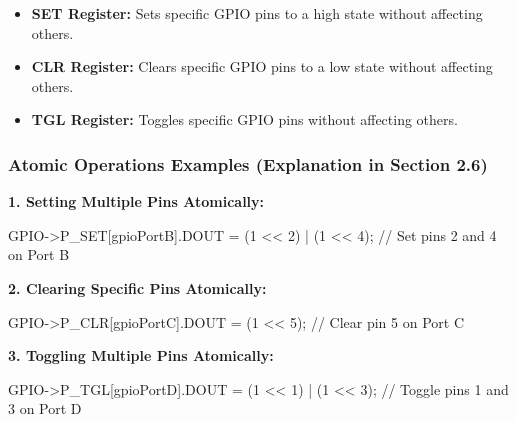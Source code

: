 \documentclass[
  9pt,
  letterpaper,
  abstract,
  titlepage]{scrbook}
\newenvironment{Shaded}{\begin{snugshade}}{\end{snugshade}}
\newcommand{\CommentTok}[1]{\textcolor[rgb]{0.37,0.37,0.37}{#1}}
\newcommand{\DecValTok}[1]{\textcolor[rgb]{0.68,0.00,0.00}{#1}}
\newcommand{\NormalTok}[1]{\textcolor[rgb]{0.00,0.23,0.31}{#1}}
\newcommand{\OperatorTok}[1]{\textcolor[rgb]{0.37,0.37,0.37}{#1}}
\begin{document}
\begin{itemize}
\item
  \textbf{SET Register:} Sets specific GPIO pins to a high state without
  affecting others.
\item
  \textbf{CLR Register:} Clears specific GPIO pins to a low state
  without affecting others.
\item
  \textbf{TGL Register:} Toggles specific GPIO pins without affecting
  others.
\end{itemize}

\subsubsection{Atomic Operations Examples (Explanation in Section
2.6)}\label{atomic-operations-examples-explanation-in-section-2.6}

\textbf{1. Setting Multiple Pins Atomically:}

\begin{Shaded}
\begin{Highlighting}[]
\NormalTok{GPIO}\OperatorTok{{-}\textgreater{}}\NormalTok{P\_SET}\OperatorTok{[}\NormalTok{gpioPortB}\OperatorTok{].}\NormalTok{DOUT }\OperatorTok{=} \OperatorTok{(}\DecValTok{1} \OperatorTok{\textless{}\textless{}} \DecValTok{2}\OperatorTok{)} \OperatorTok{|} \OperatorTok{(}\DecValTok{1} \OperatorTok{\textless{}\textless{}} \DecValTok{4}\OperatorTok{);} \CommentTok{// Set pins 2 and 4 on Port B}
\end{Highlighting}
\end{Shaded}

\textbf{2. Clearing Specific Pins Atomically:}

\begin{Shaded}
\begin{Highlighting}[]
\NormalTok{GPIO}\OperatorTok{{-}\textgreater{}}\NormalTok{P\_CLR}\OperatorTok{[}\NormalTok{gpioPortC}\OperatorTok{].}\NormalTok{DOUT }\OperatorTok{=} \OperatorTok{(}\DecValTok{1} \OperatorTok{\textless{}\textless{}} \DecValTok{5}\OperatorTok{);} \CommentTok{// Clear pin 5 on Port C}
\end{Highlighting}
\end{Shaded}

\textbf{3. Toggling Multiple Pins Atomically:}

\begin{Shaded}
\begin{Highlighting}[]
\NormalTok{GPIO}\OperatorTok{{-}\textgreater{}}\NormalTok{P\_TGL}\OperatorTok{[}\NormalTok{gpioPortD}\OperatorTok{].}\NormalTok{DOUT }\OperatorTok{=} \OperatorTok{(}\DecValTok{1} \OperatorTok{\textless{}\textless{}} \DecValTok{1}\OperatorTok{)} \OperatorTok{|} \OperatorTok{(}\DecValTok{1} \OperatorTok{\textless{}\textless{}} \DecValTok{3}\OperatorTok{);} \CommentTok{// Toggle pins 1 and 3 on Port D}
\end{Highlighting}
\end{Shaded}
\end{document}
